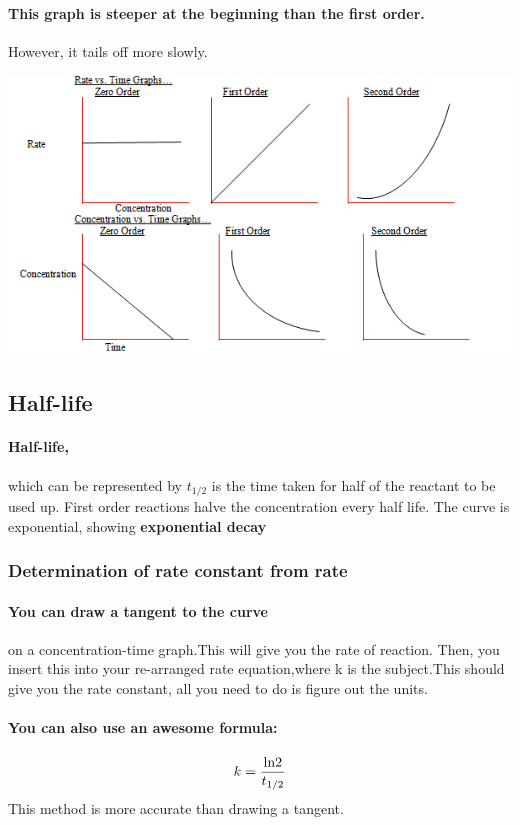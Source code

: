 \paragraph{This graph is steeper at the beginning than the first order.}However, it tails off more slowly.
\begin{center}
\includegraphics[scale=0.5]{conctimegraphs.png}
\end{center}
\subsection{Half-life}
\paragraph{Half-life,}which can be represented by $t_{1/2}$ is the time taken for half of the reactant to be used up. First order reactions halve the concentration every half life. The curve is exponential, showing \textbf{exponential decay}
\subsubsection{Determination of rate constant from rate}
\paragraph{You can draw a tangent to the curve}on a concentration-time graph.This will give you the rate of reaction. Then, you insert this into your re-arranged rate equation,where k is the subject.This should give you the rate constant, all you need to do is figure out the units.
\paragraph{You can also use an awesome formula:}\begin{equation}
k=\frac{\textnormal{ln}2}{t_{1/2}}
\end{equation}
This method is more accurate than drawing a tangent.
